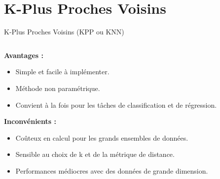 \documentclass{beamer}
\begin{document}
\section{K-Plus Proches Voisins}

\begin{frame}{K-Plus Proches Voisins (KPP ou KNN)}
  \begin{columns}
    \begin{column}{0.5\textwidth}
      \textbf{Avantages :}
      \begin{itemize}
        \setlength\itemsep{0.5em}
        \item Simple et facile à implémenter.
        \item Méthode non paramétrique.
        \item Convient à la fois pour les tâches de classification et de régression.
      \end{itemize}
      \vspace{1em}
      \textbf{Inconvénients :}
      \begin{itemize}
        \setlength\itemsep{0.5em}
        \item Coûteux en calcul pour les grands ensembles de données.
        \item Sensible au choix de k et de la métrique de distance.
        \item Performances médiocres avec des données de grande dimension.
      \end{itemize}
    \end{column}
    \begin{column}{0.6\textwidth}
      \begin{center}
\end{center}
\end{column}
\end{columns}
\end{frame}
\end{document}
